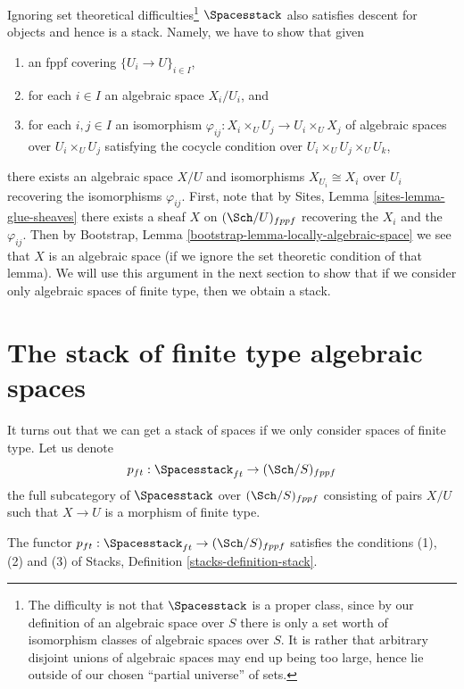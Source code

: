 \begin{remark}
\label{remark-stack-spaces}
Ignoring set theoretical difficulties\footnote{The difficulty is not
that $\Spacesstack$ is a proper class, since by our definition of
an algebraic space over $S$ there is only a set worth of isomorphism
classes of algebraic spaces over $S$. It is rather that arbitrary disjoint
unions of algebraic spaces may end up being too large, hence lie outside
of our chosen ``partial universe'' of sets.}
$\Spacesstack$ also satisfies
descent for objects and hence is a stack. Namely, we have to show that
given
\begin{enumerate}
\item an fppf covering $\{U_i \to U\}_{i \in I}$,
\item for each $i \in I$ an algebraic space $X_i/U_i$, and
\item for each $i, j \in I$ an isomorphism
$\varphi_{ij} : X_i \times_U U_j \to U_i \times_U X_j$ of algebraic spaces
over $U_i \times_U U_j$ satisfying the cocycle condition over
$U_i \times_U U_j \times_U U_k$,
\end{enumerate}
there exists an algebraic space $X/U$ and isomorphisms
$X_{U_i} \cong X_i$ over $U_i$ recovering the isomorphisms $\varphi_{ij}$.
First, note that by
Sites, Lemma \ref{sites-lemma-glue-sheaves}
there exists a sheaf $X$ on $(\Sch/U)_{fppf}$ recovering
the $X_i$ and the $\varphi_{ij}$. Then by
Bootstrap, Lemma \ref{bootstrap-lemma-locally-algebraic-space}
we see that $X$ is an algebraic space (if we ignore the set theoretic
condition of that lemma).
We will use this argument in the next section to show that
if we consider only algebraic spaces of finite type, then we obtain
a stack.
\end{remark}






\section{The stack of finite type algebraic spaces}
\label{section-stack-of-finite-type-spaces}


\noindent
It turns out that we can get a stack of spaces
if we only consider spaces of finite type.
Let us denote
$$
p_{ft} : \Spacesstack_{ft} \to (\Sch/S)_{fppf}
$$
the full subcategory of $\Spacesstack$ over $(\Sch/S)_{fppf}$
consisting of pairs $X/U$ such that $X \to U$
is a morphism of finite type.

\begin{lemma}
\label{lemma-stack-of-finite-type-spaces}
The functor
$p_{ft} : \Spacesstack_{ft} \to (\Sch/S)_{fppf}$
satisfies the conditions (1), (2) and (3) of
Stacks, Definition \ref{stacks-definition-stack}.
\end{lemma}

